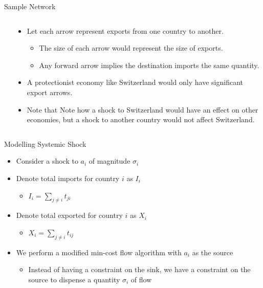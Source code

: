 \documentclass[
  ignorenonframetext,
]{beamer}
\providecommand{\tightlist}{%
  \setlength{\itemsep}{0pt}\setlength{\parskip}{0pt}}
\begin{document}
\begin{frame}{Sample Network}
\protect\hypertarget{sample-network}{}

\begin{columns}[T]
\begin{column}{0.6\textwidth}
\end{column}

\begin{column}{0.4\textwidth}
\begin{itemize}
\tightlist
\item
  Let each arrow represent exports from one country to another.

  \begin{itemize}
  \tightlist
  \item
    The size of each arrow would represent the size of exports.
  \item
    Any forward arrow implies the destination imports the same quantity.
  \end{itemize}
\item
  A protectionist economy like Switzerland would only have significant
  export arrows.
\item
  Note that Note how a shock to Switzerland would have an effect on
  other economies, but a shock to another country would not affect
  Switzerland.
\end{itemize}
\end{column}
\end{columns}

\end{frame}

\begin{frame}{Modelling Systemic Shock}
\protect\hypertarget{modelling-systemic-shock}{}

\begin{itemize}
\tightlist
\item
  Consider a shock to \(a_i\) of magnitude \(\sigma_i\)
\item
  Denote total imports for country \(i\) as \(I_i\)

  \begin{itemize}
  \tightlist
  \item
    \(I_i=\sum_{j\neq i}t_{ji}\)
  \end{itemize}
\item
  Denote total exported for country \(i\) as \(X_i\)

  \begin{itemize}
  \tightlist
  \item
    \(X_i=\sum_{j\neq i}t_{ij}\)
  \end{itemize}
\item
  We perform a modified min-cost flow algorithm with \(a_i\) as the
  source

  \begin{itemize}
  \tightlist
  \item
    Instead of having a constraint on the sink, we have a constraint on
    the source to dispense a quantity \(\sigma_i\) of flow
  \end{itemize}
\end{itemize}

\end{frame}
\end{document}
